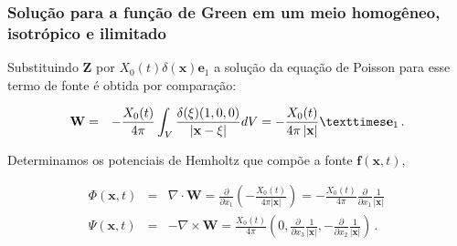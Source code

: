 \documentclass[xcolor=table]{beamer}
\newcommand{\xvec}{\mathbf{x}}
\newcommand{\evec}{\mathbf{e}}
\newcommand{\fvec}{\mathbf{f}}
\newcommand{\xivec}{\boldmath \xi}
\begin{document}
\begin{frame}
\frametitle{\textbf{Solu\c{c}\~ao para a fun\c{c}\~ao de Green em um meio homog\^eneo, isotr\'opico e ilimitado}}

\begin{flushleft}
Substituindo $\mathbf{Z}$ por $X_{0}(t)\delta(\xvec)\evec_1$ a solu\c{c}\~ao da equa\c{c}\~ao de Poisson 
para esse termo de fonte \'e obtida por compara\c{c}\~ao:
\end{flushleft}
\begin{eqnarray}
  \label{ten1}
     \mathbf{W} &=& - \frac{X_{0}(t)}{4\pi} \int_{V} \frac{\delta(\xivec) (1,0,0)}{\left| \xvec - \xivec \right|} dV =  - \frac{X_{0}(t)}{4\pi\left| \xvec \right|}{×} \evec_1\,  .
 \end{eqnarray}
\begin{flushleft}
Determinamos os potenciais de Hemholtz que comp\~oe a fonte $\fvec(\xvec,t)$,    
 \end{flushleft}
\begin{eqnarray}
  \label{ten1}
      \Phi(\xvec,t) &=& \nabla \cdot \mathbf{W} = \frac{\partial }{\partial x_1} \left( -\frac{X_{0}(t)}{4\pi\left| \xvec \right|} \right) = - \frac{X_{0}(t)}{4\pi} \frac{\partial }{\partial x_1} \frac{1}{\left| \xvec \right|} \, \\ 
      \Psi(\xvec,t) &=& - \nabla \times \mathbf{W} =  \frac{X_{0}(t)}{4\pi}\left(0, \frac{\partial }{\partial x_3}  \frac{1}{\left| \xvec \right|},-\frac{\partial }{\partial x_2} \frac{1}{\left| \xvec \right|}  \right)\, .
\end{eqnarray}
    
\end{frame}%
\end{document}
